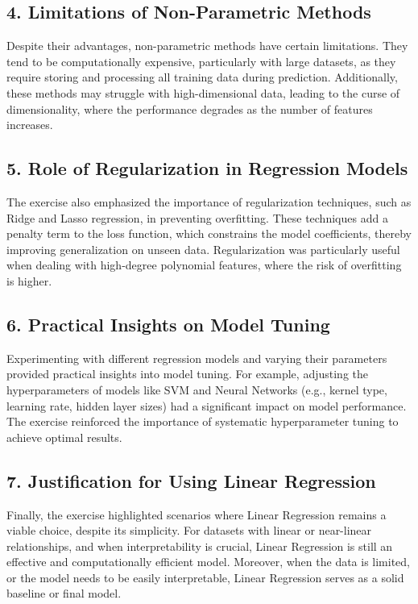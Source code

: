 \subsection*{4. Limitations of Non-Parametric Methods}
Despite their advantages, non-parametric methods have certain limitations. They tend to be computationally expensive, particularly with large datasets, as they require storing and processing all training data during prediction. Additionally, these methods may struggle with high-dimensional data, leading to the curse of dimensionality, where the performance degrades as the number of features increases.

\subsection*{5. Role of Regularization in Regression Models}
The exercise also emphasized the importance of regularization techniques, such as Ridge and Lasso regression, in preventing overfitting. These techniques add a penalty term to the loss function, which constrains the model coefficients, thereby improving generalization on unseen data. Regularization was particularly useful when dealing with high-degree polynomial features, where the risk of overfitting is higher.

\subsection*{6. Practical Insights on Model Tuning}
Experimenting with different regression models and varying their parameters provided practical insights into model tuning. For example, adjusting the hyperparameters of models like SVM and Neural Networks (e.g., kernel type, learning rate, hidden layer sizes) had a significant impact on model performance. The exercise reinforced the importance of systematic hyperparameter tuning to achieve optimal results.

\subsection*{7. Justification for Using Linear Regression}
Finally, the exercise highlighted scenarios where Linear Regression remains a viable choice, despite its simplicity. For datasets with linear or near-linear relationships, and when interpretability is crucial, Linear Regression is still an effective and computationally efficient model. Moreover, when the data is limited, or the model needs to be easily interpretable, Linear Regression serves as a solid baseline or final model.




\clearpage